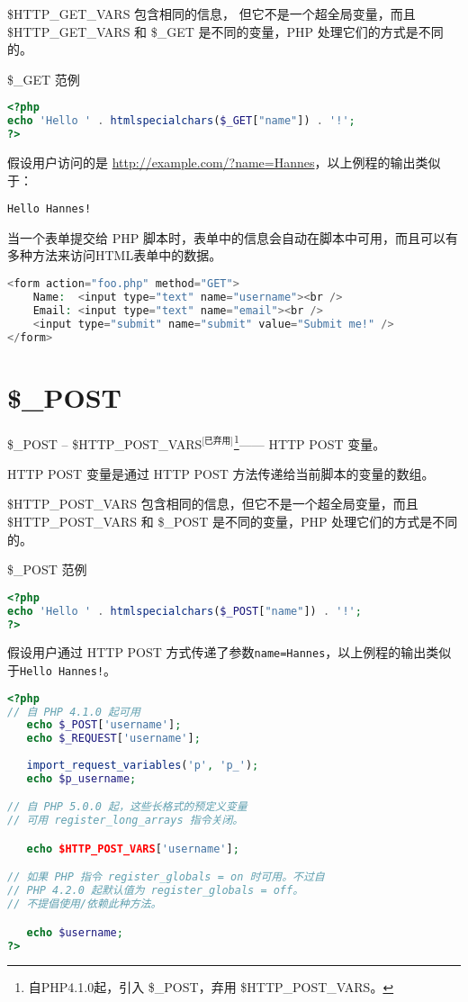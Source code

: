 \$HTTP\_GET\_VARS 包含相同的信息， 但它不是一个超全局变量，而且\$HTTP\_GET\_VARS 和 \$\_GET 是不同的变量，PHP 处理它们的方式是不同的。

\begin{example}
\$\_GET 范例
\begin{lstlisting}[language=PHP]
<?php
echo 'Hello ' . htmlspecialchars($_GET["name"]) . '!';
?>
\end{lstlisting}
\end{example}

假设用户访问的是 \url{http://example.com/?name=Hannes}，以上例程的输出类似于：

\begin{verbatim}
Hello Hannes!
\end{verbatim}


当一个表单提交给 PHP 脚本时，表单中的信息会自动在脚本中可用，而且可以有多种方法来访问HTML表单中的数据。

\begin{lstlisting}[language=PHP]
<form action="foo.php" method="GET">
    Name:  <input type="text" name="username"><br />
    Email: <input type="text" name="email"><br />
    <input type="submit" name="submit" value="Submit me!" />
</form>
\end{lstlisting}


\section{\$\_POST}

\$\_POST -- \$HTTP\_POST\_VARS$^{\text{[已弃用]}}$\footnote{自PHP4.1.0起，引入 \$\_POST，弃用 \$HTTP\_POST\_VARS。}—— HTTP POST 变量。

HTTP POST 变量是通过 HTTP POST 方法传递给当前脚本的变量的数组。

\$HTTP\_POST\_VARS 包含相同的信息，但它不是一个超全局变量，而且\$HTTP\_POST\_VARS 和 \$\_POST 是不同的变量，PHP 处理它们的方式是不同的。



\begin{example}
\$\_POST 范例
\begin{lstlisting}[language=PHP]
<?php
echo 'Hello ' . htmlspecialchars($_POST["name"]) . '!';
?>
\end{lstlisting}
\end{example}

假设用户通过 HTTP POST 方式传递了参数\texttt{name=Hannes}，以上例程的输出类似于\texttt{Hello Hannes!}。


\begin{lstlisting}[language=PHP]
<?php
// 自 PHP 4.1.0 起可用
   echo $_POST['username'];
   echo $_REQUEST['username'];
   
   import_request_variables('p', 'p_');
   echo $p_username;

// 自 PHP 5.0.0 起，这些长格式的预定义变量
// 可用 register_long_arrays 指令关闭。

   echo $HTTP_POST_VARS['username'];

// 如果 PHP 指令 register_globals = on 时可用。不过自
// PHP 4.2.0 起默认值为 register_globals = off。
// 不提倡使用/依赖此种方法。

   echo $username;
?>
\end{lstlisting}

